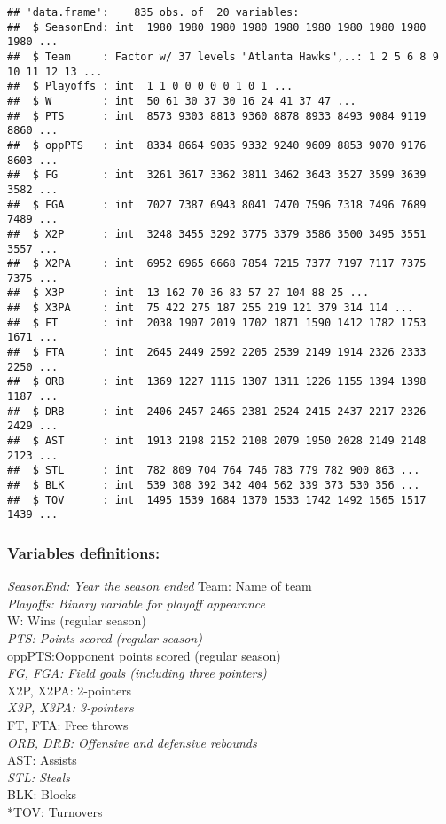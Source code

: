 \documentclass[]{article}
\begin{document}
\begin{verbatim}
## 'data.frame':    835 obs. of  20 variables:
##  $ SeasonEnd: int  1980 1980 1980 1980 1980 1980 1980 1980 1980 1980 ...
##  $ Team     : Factor w/ 37 levels "Atlanta Hawks",..: 1 2 5 6 8 9 10 11 12 13 ...
##  $ Playoffs : int  1 1 0 0 0 0 0 1 0 1 ...
##  $ W        : int  50 61 30 37 30 16 24 41 37 47 ...
##  $ PTS      : int  8573 9303 8813 9360 8878 8933 8493 9084 9119 8860 ...
##  $ oppPTS   : int  8334 8664 9035 9332 9240 9609 8853 9070 9176 8603 ...
##  $ FG       : int  3261 3617 3362 3811 3462 3643 3527 3599 3639 3582 ...
##  $ FGA      : int  7027 7387 6943 8041 7470 7596 7318 7496 7689 7489 ...
##  $ X2P      : int  3248 3455 3292 3775 3379 3586 3500 3495 3551 3557 ...
##  $ X2PA     : int  6952 6965 6668 7854 7215 7377 7197 7117 7375 7375 ...
##  $ X3P      : int  13 162 70 36 83 57 27 104 88 25 ...
##  $ X3PA     : int  75 422 275 187 255 219 121 379 314 114 ...
##  $ FT       : int  2038 1907 2019 1702 1871 1590 1412 1782 1753 1671 ...
##  $ FTA      : int  2645 2449 2592 2205 2539 2149 1914 2326 2333 2250 ...
##  $ ORB      : int  1369 1227 1115 1307 1311 1226 1155 1394 1398 1187 ...
##  $ DRB      : int  2406 2457 2465 2381 2524 2415 2437 2217 2326 2429 ...
##  $ AST      : int  1913 2198 2152 2108 2079 1950 2028 2149 2148 2123 ...
##  $ STL      : int  782 809 704 764 746 783 779 782 900 863 ...
##  $ BLK      : int  539 308 392 342 404 562 339 373 530 356 ...
##  $ TOV      : int  1495 1539 1684 1370 1533 1742 1492 1565 1517 1439 ...
\end{verbatim}

\subsubsection{Variables definitions:}\label{variables-definitions}

\emph{SeasonEnd: Year the season ended }Team: Name of team\\
\emph{Playoffs: Binary variable for playoff appearance\\
}W: Wins (regular season)\\
\emph{PTS: Points scored (regular season)\\
}oppPTS:Oopponent points scored (regular season)\\
\emph{FG, FGA: Field goals (including three pointers)\\
}X2P, X2PA: 2-pointers\\
\emph{X3P, X3PA: 3-pointers\\
}FT, FTA: Free throws\\
\emph{ORB, DRB: Offensive and defensive rebounds\\
}AST: Assists\\
\emph{STL: Steals\\
}BLK: Blocks\\
*TOV: Turnovers
\end{document}
